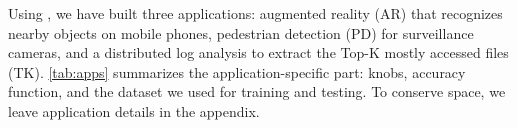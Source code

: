 Using \sysname{}, we have built three applications: augmented reality (AR) that
recognizes nearby objects on mobile phones, pedestrian detection (PD) for
surveillance cameras, and a distributed log analysis to extract the Top-K mostly
accessed files (TK). \autoref{tab:apps} summarizes the application-specific
part: knobs, accuracy function, and the dataset we used for training and
testing. To conserve space, we leave application details in the appendix.


